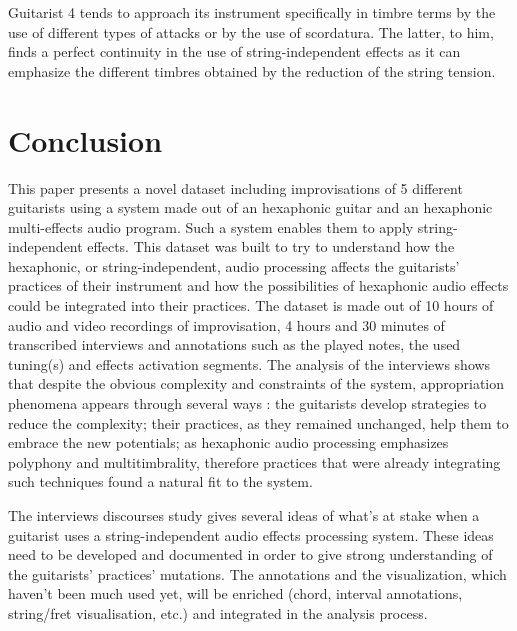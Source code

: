 \documentclass{article}
\begin{document}
Guitarist 4 tends to approach its instrument specifically in timbre terms by the use of different types of attacks or by the use of scordatura. The latter, to him, finds a perfect continuity in the use of string-independent effects as it can emphasize the different timbres obtained by the reduction of the string tension. 




\section{Conclusion}
This paper presents a novel dataset including improvisations of 5 different guitarists using a system made out of an hexaphonic guitar and an hexaphonic multi-effects audio program. Such a system enables them to apply string-independent effects. This dataset was built to try to understand how the hexaphonic, or string-independent, audio processing affects the guitarists' practices of their instrument and how the possibilities of hexaphonic audio effects could be integrated into their practices. The dataset is made out of 10 hours of audio and video recordings of improvisation, 4 hours and 30 minutes of transcribed interviews and annotations such as the played notes, the used tuning(s) and effects activation segments.
The analysis of the interviews shows that despite the obvious complexity and constraints of the system, appropriation phenomena appears through several ways : the guitarists develop strategies to reduce the complexity; their practices, as they remained unchanged, help them to embrace the new potentials; as hexaphonic audio processing emphasizes polyphony and multitimbrality, therefore practices that were already integrating such techniques found a natural fit to the system. 

The interviews discourses study gives several ideas of what's at stake when a guitarist uses a string-independent audio effects processing system. These ideas need to be developed and documented in order to give strong understanding of the guitarists' practices' mutations. The annotations and the visualization, which haven't been much used yet, will be enriched (chord, interval annotations, string/fret visualisation, etc.) and integrated in the analysis process.
\end{document}
